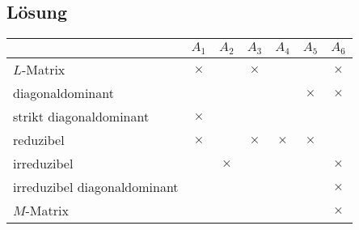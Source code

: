 \documentclass{exercise}
\begin{document}
    \subsection*{Lösung}
    \begin{center}
        \begin{tabular}{lcccccc}
            \toprule
            & \(A_1\) & \(A_2\) & \(A_3\) & \(A_4\) & \(A_5\) & \(A_6\)\\
            \midrule
            \(L\)-Matrix & \(\times\) & \(\) & \(\times\) & \(\) & \(\) & \(\times\)\\
            diagonaldominant & \(\) & \(\) & \(\) & \(\) & \(\times\) & \(\times\)\\
            strikt diagonaldominant & \(\times\) & \(\) & \(\) & \(\) & \(\) & \(\)\\
            reduzibel & \(\times\) & \(\) & \(\times\) & \(\times\) & \(\times\) & \(\)\\
            irreduzibel & \(\) & \(\times\) & \(\) & \(\) & \(\) & \(\times\)\\
            irreduzibel diagonaldominant & \(\) & \(\) & \(\) & \(\) & \(\) & \(\times\)\\
            \(M\)-Matrix & \(\) & \(\) & \(\) & \(\) & \(\) & \(\times\)\\
            \bottomrule
        \end{tabular}
    \end{center}
\end{document}
